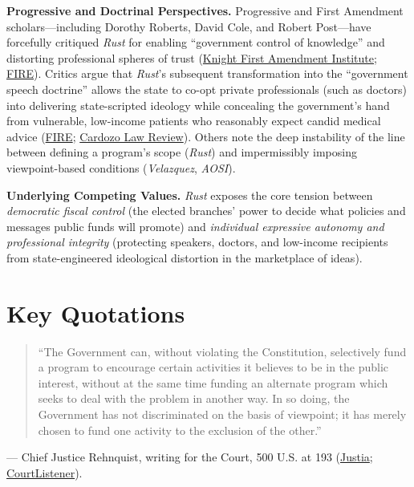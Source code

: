 \documentclass[12pt]{article}
\begin{document}
\textbf{Progressive and Doctrinal Perspectives.} Progressive and First Amendment scholars---including Dorothy Roberts, David Cole, and Robert Post---have forcefully critiqued \textit{Rust} for enabling ``government control of knowledge'' and distorting professional spheres of trust (\href{https://knightcolumbia.org/content/the-government-speech-doctrine-goes-to-school}{Knight First Amendment Institute}; \href{https://www.fire.org/news/harvard-law-review-note-tackles-complex-issue-distinguishing-government-versus-private-speech}{FIRE}). Critics argue that \textit{Rust}'s subsequent transformation into the ``government speech doctrine'' allows the state to co-opt private professionals (such as doctors) into delivering state-scripted ideology while concealing the government's hand from vulnerable, low-income patients who reasonably expect candid medical advice (\href{https://www.fire.org/research-learn/what-government-speech-doctrine}{FIRE}; \href{https://www.cardozolawreview.com/the-end-of-government-speech/}{Cardozo Law Review}). Others note the deep instability of the line between defining a program's scope (\textit{Rust}) and impermissibly imposing viewpoint-based conditions (\textit{Velazquez}, \textit{AOSI}).

\textbf{Underlying Competing Values.} \textit{Rust} exposes the core tension between \textit{democratic fiscal control} (the elected branches' power to decide what policies and messages public funds will promote) and \textit{individual expressive autonomy and professional integrity} (protecting speakers, doctors, and low-income recipients from state-engineered ideological distortion in the marketplace of ideas).

\section{Key Quotations}

\begin{quote}
``The Government can, without violating the Constitution, selectively fund a program to encourage certain activities it believes to be in the public interest, without at the same time funding an alternate program which seeks to deal with the problem in another way. In so doing, the Government has not discriminated on the basis of viewpoint; it has merely chosen to fund one activity to the exclusion of the other.''
\end{quote}
\noindent --- Chief Justice Rehnquist, writing for the Court, 500 U.S. at 193 (\href{https://supreme.justia.com/cases/federal/us/500/173/}{Justia}; \href{https://www.courtlistener.com/opinion/112593/rust-v-sullivan/}{CourtListener}).
\end{document}
